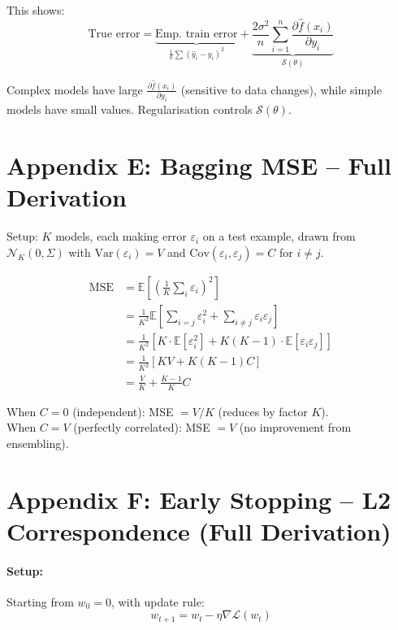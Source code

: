 \documentclass[12pt,a4paper]{article}
\newcommand{\E}{\mathbb{E}}
\newcommand{\Var}{\mathrm{Var}}
\newcommand{\Cov}{\mathrm{Cov}}
\newcommand{\grad}{\nabla}
\newcommand{\Loss}{\mathcal{L}}
\newcommand{\Reg}{\mathcal{S}}
\begin{document}
This shows:
\[
  \text{True error}
  = \underbrace{\text{Emp.\ train error}}_{\frac{1}{n}\sum(\hat{y}_i-y_i)^2}
  + \underbrace{\frac{2\sigma^2}{n}\sum_{i=1}^{n}\frac{\partial\hat{f}(x_i)}{\partial y_i}}_{\Reg(\theta)}
\]

Complex models have large $\frac{\partial\hat{f}(x_i)}{\partial y_i}$ (sensitive to data changes), while simple models have small values. Regularisation controls $\Reg(\theta)$.

\section{Appendix E: Bagging MSE -- Full Derivation}

Setup: $K$ models, each making error $\varepsilon_i$ on a test example, drawn from $\mathcal{N}_K(0, \Sigma)$ with $\Var(\varepsilon_i) = V$ and $\Cov(\varepsilon_i, \varepsilon_j) = C$ for $i \neq j$.

\begin{align*}
  \text{MSE}
  &= \E\!\left[\left(\frac{1}{K}\sum_i\varepsilon_i\right)^2\right]\\
  &= \frac{1}{K^2}\E\!\left[\sum_{i=j}\varepsilon_i^2 + \sum_{i\neq j}\varepsilon_i\varepsilon_j\right]\\
  &= \frac{1}{K^2}\left[K\cdot\E[\varepsilon_i^2] + K(K-1)\cdot\E[\varepsilon_i\varepsilon_j]\right]\\
  &= \frac{1}{K^2}[KV + K(K-1)C]\\
  &= \frac{V}{K} + \frac{K-1}{K}C
\end{align*}

When $C = 0$ (independent): MSE $= V/K$ (reduces by factor $K$).\\
When $C = V$ (perfectly correlated): MSE $= V$ (no improvement from ensembling).

\section{Appendix F: Early Stopping -- L2 Correspondence (Full Derivation)}

\paragraph{Setup:} Starting from $w_0 = 0$, with update rule:
\[
  w_{t+1} = w_t - \eta\grad\Loss(w_t)
\]
\end{document}
